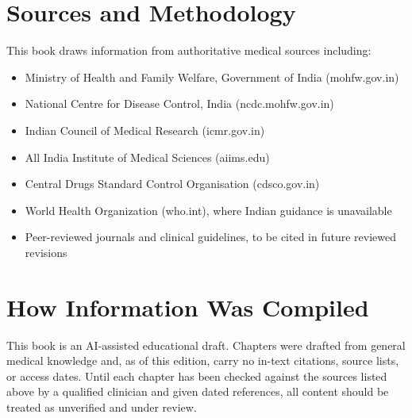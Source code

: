 \documentclass[12pt,oneside]{book}
\begin{document}


































\appendix

\section*{Sources and Methodology}
This book draws information from authoritative medical sources including:
\begin{itemize}
  \item Ministry of Health and Family Welfare, Government of India (mohfw.gov.in)
  \item National Centre for Disease Control, India (ncdc.mohfw.gov.in)
  \item Indian Council of Medical Research (icmr.gov.in)
  \item All India Institute of Medical Sciences (aiims.edu)
  \item Central Drugs Standard Control Organisation (cdsco.gov.in)
  \item World Health Organization (who.int), where Indian guidance is unavailable
  \item Peer-reviewed journals and clinical guidelines, to be cited in future reviewed revisions
\end{itemize}

\section*{How Information Was Compiled}
This book is an AI-assisted educational draft. Chapters were drafted from general medical knowledge and, as of this edition, carry no in-text citations, source lists, or access dates. Until each chapter has been checked against the sources listed above by a qualified clinician and given dated references, all content should be treated as unverified and under review.
\end{document}
